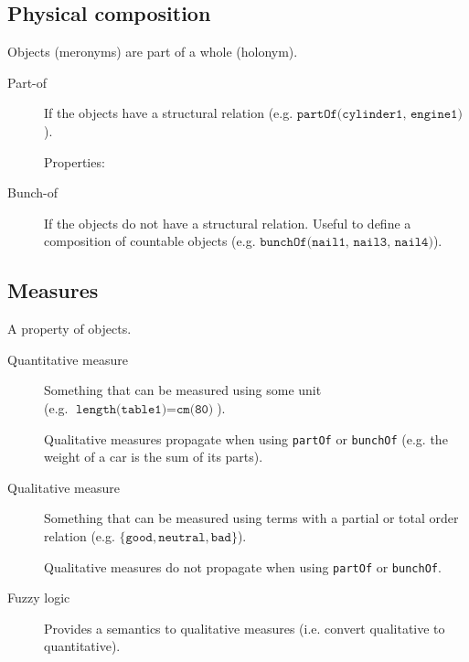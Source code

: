 \subsection{Physical composition}
Objects (meronyms) are part of a whole (holonym).

\begin{description}
    \item[Part-of] 
        If the objects have a structural relation (e.g. $\texttt{partOf(cylinder1, engine1)}$).

        Properties:

    \item[Bunch-of] 
        If the objects do not have a structural relation.
        Useful to define a composition of countable objects
        (e.g. $\texttt{bunchOf({nail1, nail3, nail4})}$).
\end{description}


\subsection{Measures}

A property of objects.

\begin{description}
    \item[Quantitative measure] 
        Something that can be measured using some unit\\
        (e.g. $\texttt{length(table1)} = \texttt{cm(80)}$).

        Qualitative measures propagate when using \texttt{partOf} or \texttt{bunchOf} 
        (e.g. the weight of a car is the sum of its parts).

    \item[Qualitative measure] 
        Something that can be measured using terms with a partial or total order relation
        (e.g. $\{ \texttt{good}, \texttt{neutral}, \texttt{bad} \}$).

        Qualitative measures do not propagate when using \texttt{partOf} or \texttt{bunchOf}.

    \item[Fuzzy logic] 
        Provides a semantics to qualitative measures (i.e. convert qualitative to quantitative).
\end{description}


